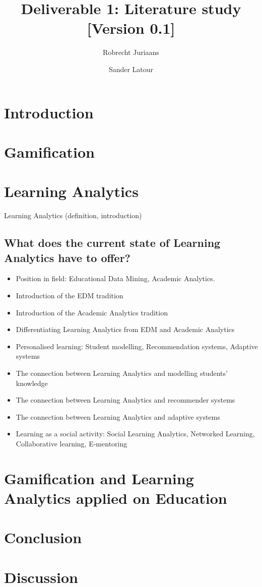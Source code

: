 \documentclass{article}
\title{Deliverable 1: Literature study \small{[Version 0.1]}}
\author{Robrecht Juriaans \and Sander Latour}
\begin{document}
\maketitle

\section{Introduction}

\section{Gamification}

\section{Learning Analytics}
Learning Analytics (definition, introduction)
\subsection{What does the current state of Learning Analytics have to offer?}
\begin{itemize}
\item Position in field: Educational Data Mining, Academic Analytics.
\item Introduction of the EDM tradition
\item Introduction of the Academic Analytics tradition
\item Differentiating Learning Analytics from EDM and Academic Analytics
\item Personalised learning: Student modelling, Recommendation systems, Adaptive systems
\item The connection between Learning Analytics and modelling students’ knowledge
\item The connection between Learning Analytics and recommender systems
\item The connection between Learning Analytics and adaptive systems
\item Learning as a social activity: Social Learning Analytics, Networked Learning, Collaborative learning, E-mentoring
\end{itemize}


\section{Gamification and Learning Analytics applied on Education}

\section{Conclusion}

\section{Discussion}
\end{document}
